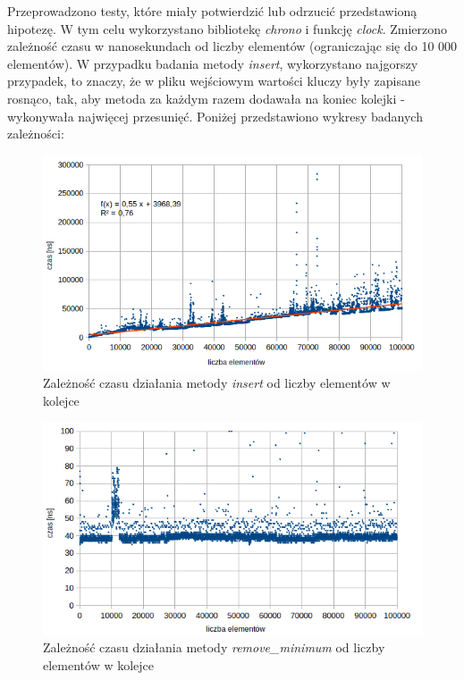 \documentclass[12pt]{article}
\begin{document}
Przeprowadzono testy, które miały potwierdzić lub odrzucić przedstawioną hipotezę.
W tym celu wykorzystano bibliotekę \textit{chrono} i funkcję \textit{clock}.
Zmierzono zależność czasu w nanosekundach od liczby elementów (ograniczając się 
do 10 000 elementów). W przypadku badania metody \textit{insert}, wykorzystano najgorszy przypadek,
to znaczy, że w pliku wejściowym wartości kluczy były zapisane rosnąco, tak, aby metoda za każdym razem dodawała 
na koniec kolejki - wykonywała najwięcej przesunięć. Poniżej przedstawiono wykresy badanych zależności:

\begin{figure}[H]
    \centering
    \includegraphics[width=15cm]{O_insert.png}
    \caption{Zależność czasu działania metody \textit{insert} od liczby elementów w kolejce}
    \label{fig: O_insert}
\end{figure}

\begin{figure}[H]
    \centering
    \includegraphics[width=15cm]{O_remove.png}
    \caption{Zależność czasu działania metody \textit{remove\_minimum} od liczby elementów w kolejce}
    \label{fig: O_remove}
\end{figure}
\end{document}
